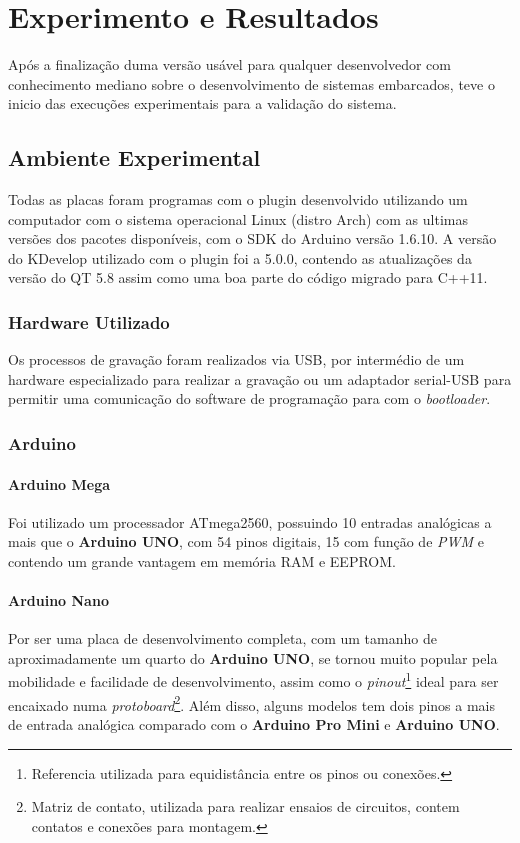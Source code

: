 \chapter{Experimento e Resultados}
Após a finalização duma versão usável para qualquer desenvolvedor com conhecimento mediano sobre o desenvolvimento de sistemas embarcados, teve o inicio das execuções experimentais para a validação do sistema.

\section{Ambiente Experimental}

Todas as placas foram programas com o plugin desenvolvido utilizando um computador com o sistema operacional Linux (distro Arch) com as ultimas versões dos pacotes disponíveis, com o SDK do Arduino versão 1.6.10. A versão do KDevelop utilizado com o plugin foi a 5.0.0, contendo as atualizações da versão do QT 5.8 assim como uma boa parte do código migrado para C++11.

\subsection{Hardware Utilizado}

Os processos de gravação foram realizados via USB, por intermédio de um hardware especializado para realizar a gravação ou um adaptador serial-USB para permitir uma comunicação do software de programação para com o \textit{bootloader}.

\subsection{Arduino}

\subsubsection{Arduino Mega}
Foi utilizado um processador ATmega2560, possuindo 10 entradas analógicas a mais que o \textbf{Arduino UNO}, com 54 pinos digitais, 15 com função de \textit{PWM} e contendo um grande vantagem em memória RAM e EEPROM.



\subsubsection{Arduino Nano}

Por ser uma placa de desenvolvimento completa, com um tamanho de aproximadamente um quarto do \textbf{Arduino UNO}, se tornou muito popular pela mobilidade e facilidade de desenvolvimento, assim como o \textit{pinout}\footnote{ Referencia utilizada para equidistância entre os pinos ou conexões.} ideal para ser encaixado numa \textit{protoboard}\footnote{Matriz de contato, utilizada para realizar ensaios de circuitos, contem contatos e conexões para montagem.}. Além disso, alguns modelos tem dois pinos a mais de entrada analógica comparado com o \textbf{Arduino Pro Mini} e \textbf{Arduino UNO}.


